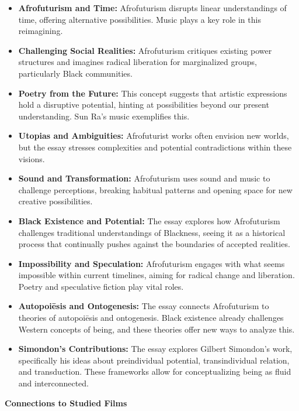 \documentclass[11pt,fleqn]{book}
\begin{document}
\begin{itemize}
\item \textbf{Afrofuturism and Time:}  Afrofuturism disrupts linear understandings of time, offering alternative possibilities. Music plays a key role in this reimagining.

\item \textbf{Challenging Social Realities:} Afrofuturism critiques existing power structures and imagines radical liberation for marginalized groups, particularly Black communities.  

\item \textbf{Poetry from the Future:} This concept suggests that artistic expressions hold a disruptive potential, hinting at possibilities beyond our present understanding. Sun Ra's music exemplifies this.

\item \textbf{Utopias and Ambiguities:} Afrofuturist works often envision new worlds, but the essay stresses complexities and potential contradictions within these visions.

\item \textbf{Sound and Transformation:} Afrofuturism uses sound and music to challenge perceptions, breaking habitual patterns and opening space for new creative possibilities. 

\item \textbf{Black Existence and Potential:} The essay explores how Afrofuturism challenges traditional understandings of Blackness, seeing it as a historical process that continually pushes against the boundaries of accepted realities.

\item \textbf{Impossibility and Speculation:} Afrofuturism engages with what seems impossible within current timelines, aiming for radical change and liberation. Poetry and speculative fiction play vital roles.

\item \textbf{Autopoiēsis and Ontogenesis:} The essay connects Afrofuturism to theories of autopoiēsis and ontogenesis. Black existence already challenges Western concepts of being, and these theories offer new ways to analyze this.

\item \textbf{Simondon's Contributions:} The essay explores Gilbert Simondon's work, specifically his ideas about preindividual potential, transindividual relation, and transduction. These frameworks allow for conceptualizing being as fluid and interconnected. 
\end{itemize}
\vspace{5pt}
\textbf{Connections to Studied Films}
\end{document}
